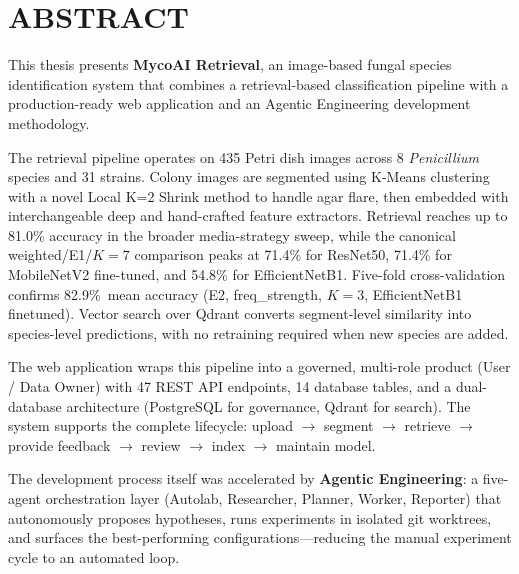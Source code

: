\newpage
\section*{ABSTRACT}

This thesis presents \textbf{MycoAI Retrieval}, an image-based fungal species identification system that combines a retrieval-based classification pipeline with a production-ready web application and an Agentic Engineering development methodology.

The retrieval pipeline operates on 435 Petri dish images across 8 \textit{Penicillium} species and 31 strains. Colony images are segmented using K-Means clustering with a novel Local K=2 Shrink method to handle agar flare, then embedded with interchangeable deep and hand-crafted feature extractors. Retrieval reaches up to 81.0\% accuracy in the broader media-strategy sweep, while the canonical weighted/E1/$K=7$ comparison peaks at 71.4\% for ResNet50, 71.4\% for MobileNetV2 fine-tuned, and 54.8\% for EfficientNetB1. Five-fold cross-validation confirms 82.9\%\ mean accuracy (E2, freq\_strength, $K=3$, EfficientNetB1 finetuned). Vector search over Qdrant converts segment-level similarity into species-level predictions, with no retraining required when new species are added.

The web application wraps this pipeline into a governed, multi-role product (User / Data Owner) with 47 REST API endpoints, 14 database tables, and a dual-database architecture (PostgreSQL for governance, Qdrant for search). The system supports the complete lifecycle: upload $\to$ segment $\to$ retrieve $\to$ provide feedback $\to$ review $\to$ index $\to$ maintain model.

The development process itself was accelerated by \textbf{Agentic Engineering}: a five-agent orchestration layer (Autolab, Researcher, Planner, Worker, Reporter) that autonomously proposes hypotheses, runs experiments in isolated git worktrees, and surfaces the best-performing configurations---reducing the manual experiment cycle to an automated loop.
